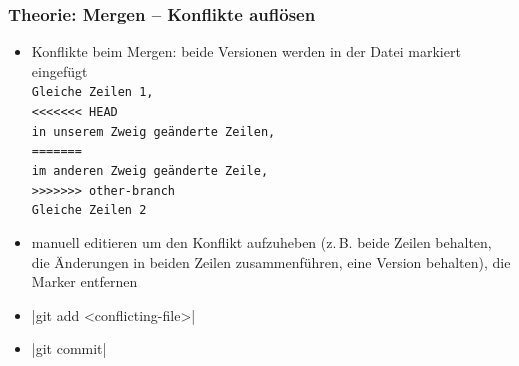 \documentclass{beamer}
\begin{document}
\begin{frame}[fragile,label=branches40]
  \frametitle{Theorie: Mergen – Konflikte auflösen}
  \begin{itemize}
  \item Konflikte beim Mergen: beide Versionen werden in der Datei markiert eingefügt\\
    \hspace*{2em}\texttt{Gleiche Zeilen 1,} \\
    \hspace*{2em}\texttt{<{}<{}<{}<{}<{}<{}< HEAD} \\
    \hspace*{2em}\texttt{in unserem Zweig geänderte Zeilen,} \\
    \hspace*{2em}\texttt{=======} \\
    \hspace*{2em}\texttt{im anderen Zweig geänderte Zeile,} \\
    \hspace*{2em}\texttt{>{}>{}>{}>{}>{}>{}> other-branch} \\
    \hspace*{2em}\texttt{Gleiche Zeilen 2}
  \item manuell editieren um den Konflikt aufzuheben (z.\,B. beide
    Zeilen behalten, die Änderungen in beiden Zeilen zusammenführen,
    eine Version behalten), die Marker entfernen
  \item \cverb|git add <conflicting-file>|
  \item \cverb|git commit|
  \end{itemize}
\end{frame}


\end{document}
